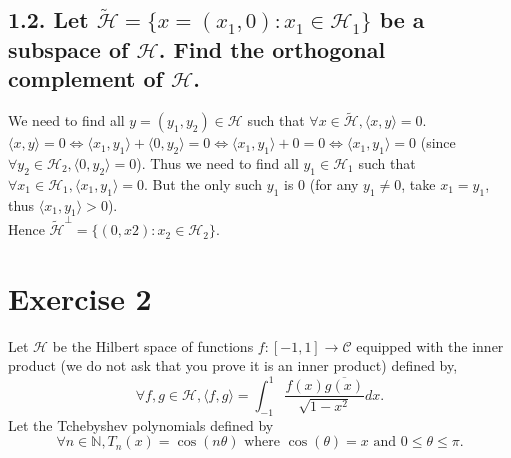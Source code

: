 \documentclass[12pt,a4paper]{article}
\newcommand{\h}{\mathcal{H}}
\newcommand{\N}{\mathbb{N}}
\newcommand{\inner}[1]{\langle #1 \rangle}
\theoremstyle{plain}
\theoremstyle{remark}
\theoremstyle{definition}
\begin{document}
\subsection*{1.2. Let $\tilde{\h} = \{x = (x_1,0) : x_1 \in \h_1\}$ be a subspace of $\h$. Find the orthogonal complement of $\h$.}
We need to find all $y = (y_1,y_2) \in \h$ such that $\forall x \in \tilde{\h}, \inner{x,y} = 0$.\\
$\inner{x,y} = 0 \Leftrightarrow \inner{x_1,y_1} + \inner{0,y_2} = 0 \Leftrightarrow \inner{x_1,y_1} + 0 = 0 \Leftrightarrow \inner{x_1,y_1} = 0$ (since $\forall y_2 \in \h_2, \inner{0,y_2} = 0$). Thus we need to find all $y_1 \in \h_1$ such that $\forall x_1 \in \h_1, \inner{x_1,y_1} = 0$. But the only such $y_1$ is $0$ (for any $y_1 \ne 0$, take $x_1 = y_1$, thus $\inner{x_1,y_1} > 0$).\\
Hence $\tilde{\h}^{\perp} = \{(0,x2) : x_2 \in \h_2 \}$.

\pagebreak
\section*{Exercise 2}
Let $\h$ be the Hilbert space of functions $f:[-1,1] \to \mathcal{C}$ equipped with the inner product (we do not ask that you prove it is an inner product) defined by,
$$\forall f,g \in \h, \inner{f,g} = \int_{-1}^{1} \frac{f(x)\overline{g(x)}}{\sqrt{1-x^2}}dx.$$
Let the Tchebyshev polynomials defined by
$$\forall n \in \N, T_n(x) = \cos(n\theta) \text{ where } \cos(\theta) = x \text{ and } 0 \le \theta \le \pi.$$
\end{document}
